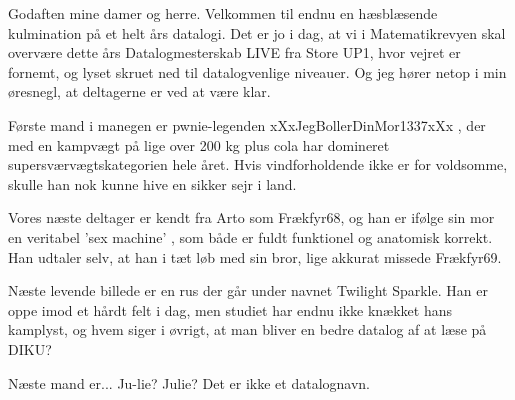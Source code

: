 \documentclass[a4paper,11pt]{article}
\begin{document}
\begin{sketch}

 Godaften mine damer og herre. Velkommen til endnu en hæsblæsende kulmination på et helt års datalogi. Det er jo i dag, at vi i Matematikrevyen skal overvære dette års Datalogmesterskab LIVE fra Store UP1, hvor vejret er fornemt, og lyset skruet ned til datalogvenlige niveauer.  Og  jeg hører netop i min øresnegl, at deltagerne er ved at være klar.


 Første mand i manegen er pwnie-legenden xXxJegBollerDinMor1337xXx , der med en kampvægt på lige over 200 kg plus cola har domineret supersværvægtskategorien hele året. Hvis vindforholdende ikke er for voldsomme, skulle han nok kunne hive en sikker sejr i land.


 Vores næste deltager er kendt fra Arto som Frækfyr68, og han er ifølge sin mor en veritabel 'sex machine' , som både er fuldt funktionel og anatomisk korrekt. Han udtaler selv, at han i tæt løb med sin bror, lige akkurat missede Frækfyr69.


 Næste levende billede er en rus der går under navnet Twilight Sparkle. Han er oppe imod et hårdt felt i dag, men studiet har endnu ikke knækket hans kamplyst, og hvem siger i øvrigt, at man bliver en bedre datalog af at læse på DIKU?


 Næste mand er...   Ju-lie?  Julie? Det er ikke et datalognavn.


\end{sketch}
\end{document}
